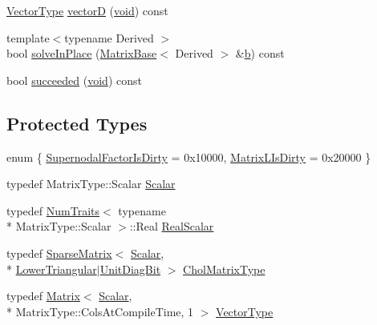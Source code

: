 \begin{DoxyCompactItemize}
\item 
\hyperlink{class_sparse_l_d_l_t_a33b87d7a821b6945a50cf94417560656}{Vector\-Type} \hyperlink{class_sparse_l_d_l_t_ac83c160ee07fb4aa8b9e0f8063991309}{vector\-D} (\hyperlink{group___u_a_v_objects_plugin_ga444cf2ff3f0ecbe028adce838d373f5c}{void}) const 
\item 
{\footnotesize template$<$typename Derived $>$ }\\bool \hyperlink{class_sparse_l_d_l_t_a8b3cc28e84124dec311371d71ceef532}{solve\-In\-Place} (\hyperlink{class_matrix_base}{Matrix\-Base}$<$ Derived $>$ \&\hyperlink{glext_8h_a6eba317e3cf44d6d26c04a5a8f197dcb}{b}) const 
\item 
bool \hyperlink{class_sparse_l_d_l_t_a2d0b1b92e825ada8112ad5b7dd5cc9dd}{succeeded} (\hyperlink{group___u_a_v_objects_plugin_ga444cf2ff3f0ecbe028adce838d373f5c}{void}) const 
\end{DoxyCompactItemize}
\subsection*{Protected Types}
\begin{DoxyCompactItemize}
\item 
enum \{ \hyperlink{class_sparse_l_d_l_t_a4e6b50be694a6eb7d2a192fdc0edab81a9971a44c20bd204dd44473238d053d67}{Supernodal\-Factor\-Is\-Dirty} = 0x10000, 
\hyperlink{class_sparse_l_d_l_t_a4e6b50be694a6eb7d2a192fdc0edab81aacb1f7e05038ee470bc6698ea892565f}{Matrix\-L\-Is\-Dirty} = 0x20000
 \}
\item 
typedef Matrix\-Type\-::\-Scalar \hyperlink{class_sparse_l_d_l_t_aa430312ee979894c41a44b200c9dfcc0}{Scalar}
\item 
typedef \hyperlink{struct_num_traits}{Num\-Traits}$<$ typename \\*
Matrix\-Type\-::\-Scalar $>$\-::Real \hyperlink{class_sparse_l_d_l_t_a3c48b09bdb95ae052b9d58f592b21913}{Real\-Scalar}
\item 
typedef \hyperlink{class_sparse_matrix}{Sparse\-Matrix}$<$ \hyperlink{class_sparse_l_d_l_t_aa430312ee979894c41a44b200c9dfcc0}{Scalar}, \\*
\hyperlink{_constants_8h_a9c6e15884c02c8075e3575670fe06894}{Lower\-Triangular}$|$\hyperlink{group__flags_ga254555b50eae5fa8a8d241f6bc08939a}{Unit\-Diag\-Bit} $>$ \hyperlink{class_sparse_l_d_l_t_afb27f74b89720bfbe06ab12409bae216}{Chol\-Matrix\-Type}
\item 
typedef \hyperlink{class_matrix}{Matrix}$<$ \hyperlink{class_sparse_l_d_l_t_aa430312ee979894c41a44b200c9dfcc0}{Scalar}, \\*
Matrix\-Type\-::\-Cols\-At\-Compile\-Time, 1 $>$ \hyperlink{class_sparse_l_d_l_t_a33b87d7a821b6945a50cf94417560656}{Vector\-Type}
\end{DoxyCompactItemize}
